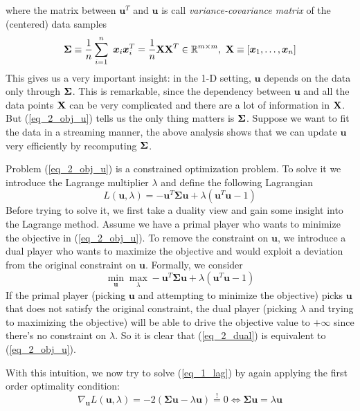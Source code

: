 \documentclass[../main.tex]{subfiles}
\begin{document}
where the matrix between $\bm{u}^T$ and $\bm{u}$ is call \emph{variance-covariance matrix} of the (centered) data samples
\begin{equation*}
\bm{\Sigma} \equiv \frac{1}{n}\sum_{i=1}^n\ \bm{x}_i\bm{x}_i^T = \frac{1}{n}{\bf XX}^T \in \mathbb{R}^{m\times m},\ {\bf X}\equiv[\bm{x}_1,\dots,\bm{x}_n]
\end{equation*}
This gives us a very important insight: in the 1-D setting, $\bm{u}$ depends on the data only through ${\bf \Sigma}$. This is remarkable, since the dependency between $\bm{u}$ and all the data points ${\bf X}$ can be very complicated and there are a lot of information in ${\bf X}$. But (\ref{eq_2_obj_u}) tells us the only thing matters is ${\bf \Sigma}$. Suppose we want to fit the data in a streaming manner, the above analysis shows that we can update $\bm{u}$ very efficiently by recomputing ${\bf \Sigma}$.
\par Problem (\ref{eq_2_obj_u}) is a constrained optimization problem. To solve it we introduce the Lagrange multiplier $\lambda$ and define the following Lagrangian
\begin{equation}\label{eq_1_lag}
L(\bm{u},\lambda) = -\bm{u}^T\bm{\Sigma u} + \lambda (\bm{u}^T\bm{u}-1)
\end{equation}
Before trying to solve it, we first take a duality view and gain some insight into the Lagrange method. Assume we have a primal player who wants to minimize the objective in (\ref{eq_2_obj_u}). To remove the constraint on $\bm{u}$, we introduce a dual player who wants to maximize the objective and would exploit a deviation from the original constraint on $\bm{u}$. Formally, we consider
\begin{equation}\label{eq_2_dual}
\min_{\bm{u}}\max_{\lambda} -\bm{u}^T\bm{\Sigma u} + \lambda (\bm{u}^T\bm{u}-1)
\end{equation}
If the primal player (picking $\bm{u}$ and attempting to minimize the objective) picks $\bm{u}$ that does not satisfy the original constraint, the dual player (picking $\lambda$ and trying to maximizing the objective) will be able to drive the objective value to $+\infty$ since there's no constraint on $\lambda$. So it is clear that (\ref{eq_2_dual}) is equivalent to (\ref{eq_2_obj_u}).
\par With this intuition, we now try to solve (\ref{eq_1_lag}) by again applying the first order optimality condition:
\begin{equation*}
\nabla_{\bm{u}} L(\bm{u},\lambda) = -2(\bm{\Sigma u}-\lambda \bm{u})\overset{!}{=}0 \Longleftrightarrow \bm{\Sigma u}=\lambda \bm{u}
\end{equation*}
\end{document}
